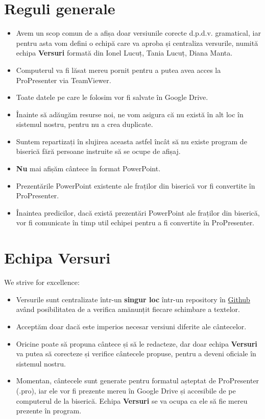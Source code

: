 \documentclass[draft,epjST]{svjour}
\begin{document}
    \section{Reguli generale}\label{sec:2}
    \begin{itemize}
        \item Avem un scop comun de a afișa doar versiunile corecte d.p.d.v. gramatical, iar pentru asta vom defini o echipă care va aproba și centraliza versurile, numită echipa \textbf{Versuri} formată din Ionel Lucuț, Tania Lucuț, Diana Manta.
        \item Computerul va fi lăsat mereu pornit pentru a putea avea acces la ProPresenter via TeamViewer.
        \item Toate datele pe care le folosim vor fi salvate în Google Drive.
        \item Înainte să adăugăm resurse noi, ne vom asigura că nu există în alt loc în sistemul nostru, pentru nu a crea duplicate.
        \item Suntem repartizați în slujirea aceasta astfel încât să nu existe program de biserică fără persoane instruite să se ocupe de afișaj.
        \item \textbf{Nu} mai afișăm cântece în format PowerPoint.
        \item Prezentările PowerPoint existente ale fraților din biserică vor fi convertite în ProPresenter.
        \item Înaintea predicilor, dacă există prezentări PowerPoint ale fraților din biserică, vor fi comunicate în timp util echipei pentru a fi convertite în ProPresenter.
    \end{itemize}
%


    \section{Echipa Versuri}\label{sec:4}
    We strive for excellence:
    \begin{itemize}
        \item Versurile sunt centralizate într-un \textbf{singur loc} într-un repository în \href{https://github.com/ioanlucut/bes-lyrics}{Github} având posibilitatea de a verifica amănunțit fiecare schimbare a textelor.
        \item Acceptăm doar dacă este imperios necesar versiuni diferite ale cântecelor.
        \item Oricine poate să propuna cântece și să le redacteze, dar doar echipa \textbf{Versuri} va putea să corecteze și verifice cântecele propuse, pentru a deveni oficiale în sistemul nostru.
        \item Momentan, cântecele sunt generate pentru formatul așteptat de ProPresenter (.pro), iar ele vor fi prezente mereu în Google Drive și accesibile de pe computerul de la biserică. Echipa \textbf{Versuri} se va ocupa ca ele să fie mereu prezente în program.
    \end{itemize}
%
\end{document}

